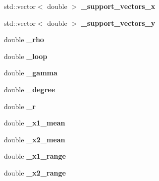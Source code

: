\begin{DoxyCompactItemize}
\item 
\hypertarget{classubana_1_1MuonCandidateFinder_a77c96b071b39a3ce14e00d0b233d4cc4}{std\-::vector$<$ double $>$ {\bfseries \-\_\-support\-\_\-vectors\-\_\-x}}\label{classubana_1_1MuonCandidateFinder_a77c96b071b39a3ce14e00d0b233d4cc4}

\item 
\hypertarget{classubana_1_1MuonCandidateFinder_a26ff1388fd925432f3b3ddcef36866d5}{std\-::vector$<$ double $>$ {\bfseries \-\_\-support\-\_\-vectors\-\_\-y}}\label{classubana_1_1MuonCandidateFinder_a26ff1388fd925432f3b3ddcef36866d5}

\item 
\hypertarget{classubana_1_1MuonCandidateFinder_ac8585a19ce1861eb280fd0b7654c0fa3}{double {\bfseries \-\_\-rho}}\label{classubana_1_1MuonCandidateFinder_ac8585a19ce1861eb280fd0b7654c0fa3}

\item 
\hypertarget{classubana_1_1MuonCandidateFinder_afe47e105b7c1de947c6c550e5efe6d28}{double {\bfseries \-\_\-loop}}\label{classubana_1_1MuonCandidateFinder_afe47e105b7c1de947c6c550e5efe6d28}

\item 
\hypertarget{classubana_1_1MuonCandidateFinder_ad0de746d1b274f4adbad51371a673a86}{double {\bfseries \-\_\-gamma}}\label{classubana_1_1MuonCandidateFinder_ad0de746d1b274f4adbad51371a673a86}

\item 
\hypertarget{classubana_1_1MuonCandidateFinder_aa428d088ef4709d0ed7452e5841c7c75}{double {\bfseries \-\_\-degree}}\label{classubana_1_1MuonCandidateFinder_aa428d088ef4709d0ed7452e5841c7c75}

\item 
\hypertarget{classubana_1_1MuonCandidateFinder_a97841e76770881e6537500b772a09a4a}{double {\bfseries \-\_\-r}}\label{classubana_1_1MuonCandidateFinder_a97841e76770881e6537500b772a09a4a}

\item 
\hypertarget{classubana_1_1MuonCandidateFinder_a659f7e59f05d5247e8c0f1468054d73c}{double {\bfseries \-\_\-x1\-\_\-mean}}\label{classubana_1_1MuonCandidateFinder_a659f7e59f05d5247e8c0f1468054d73c}

\item 
\hypertarget{classubana_1_1MuonCandidateFinder_a5da0362ad15013f47fc304b36142f992}{double {\bfseries \-\_\-x2\-\_\-mean}}\label{classubana_1_1MuonCandidateFinder_a5da0362ad15013f47fc304b36142f992}

\item 
\hypertarget{classubana_1_1MuonCandidateFinder_aaa42e26f99367921ead9841a03875567}{double {\bfseries \-\_\-x1\-\_\-range}}\label{classubana_1_1MuonCandidateFinder_aaa42e26f99367921ead9841a03875567}

\item 
\hypertarget{classubana_1_1MuonCandidateFinder_a7b4f49b181b746f2f28ed41a793a38e6}{double {\bfseries \-\_\-x2\-\_\-range}}\label{classubana_1_1MuonCandidateFinder_a7b4f49b181b746f2f28ed41a793a38e6}

\end{DoxyCompactItemize}


